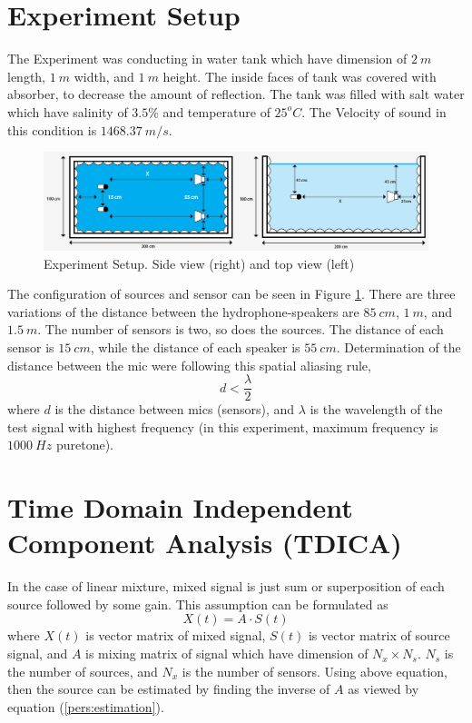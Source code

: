 \documentclass[a4paper]{jpconf}
\begin{document}
\section{Experiment Setup}
The Experiment was conducting in water tank which have dimension of $2~m$ length, $1~m$ width, and $1~m$ height. The inside faces of tank was covered with absorber, to decrease the amount of reflection. The tank was filled with salt water which have salinity of $3.5\%$ and temperature of $25^oC$. The Velocity of sound in this condition is $1468.37~m/s$.

\begin{figure}[h]
\begin{center}
\includegraphics[width=6.2in]{experimentSetupwide.png}
\end{center}
\caption{\label{pict:setup}Experiment Setup. Side view (right) and top view (left)}
\end{figure}

The configuration of sources and sensor can be seen in Figure \ref{pict:setup}. There are three variations of the distance between the hydrophone-speakers are $85~cm$, $1~m$, and $1.5~m$. The number of sensors is two, so does the sources. The distance of each sensor is $15~cm$, while the distance of each speaker is $55~cm$. Determination of the distance between the mic were following this spatial aliasing rule,
\begin{equation}\label{pers:alias}
d<\frac{\lambda}{2}
\end{equation}
where $d$ is the distance between mics (sensors), and $\lambda$ is the wavelength of the test signal with highest frequency (in this experiment, maximum frequency is $1000~Hz$ puretone). 

\section{Time Domain Independent Component Analysis (TDICA)}
In the case of linear mixture, mixed signal is just sum or superposition of each source followed by some gain. This assumption can be formulated as
\begin{equation}\label{pers:mix}
X(t)=A \cdot S(t)
\end{equation}
where $X(t)$ is vector matrix of mixed signal, $S(t)$ is vector matrix of source signal, and $A$ is mixing matrix of signal which have dimension of $N_x \times N_s$. $N_s$ is the number of sources, and $N_x$ is the number of sensors. Using above equation, then the source can be estimated by finding the inverse of $A$ as viewed by equation (\ref{pers:estimation}).
\end{document}
